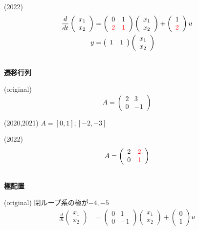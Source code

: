 \documentclass[a4paper,11pt,fleqn]{jreport}
\begin{document}
(2022)
\begin{align*}
	\frac{d}{dt}
	\left (
	\begin{array}{c}
	 x_1 \\ x_2 
	\end{array}
	\right )
	& = 
	\left (
	\begin{array}{cc}
	 0 & 1 \\
	 \color{red} 2 & \color{red} 1
	\end{array}
	\right )
	\left (
	\begin{array}{c}
	 x_1 \\ x_2 
	\end{array}
	\right )
	+
	\left (
	\begin{array}{c}
	 1 \\ \color{red} 2
	\end{array}
	\right )
	u
\\
	y 
	&=
	\left (
	\begin{array}{cc}
	 1 & 1  
	\end{array}
	\right )
	\left (
	\begin{array}{c}
	 x_1 \\ x_2 
	\end{array}
	\right )
\end{align*}

\ \\ \noindent
{\bf 遷移行列}

(original)
\[
	A= \left(\begin{array}{cc}
		2 & 3 \\
		0 & -1
	   \end{array} \right )
\]

(2020,2021) $A=[0,1];[-2,-3]$

(2022)
\[
	A= \left(\begin{array}{cc}
		2 & \color{red} 2 \\
		0 & \color{red} 1
	   \end{array} \right )
\]

\newpage
\ \\ \noindent
{\bf 極配置}

(original)
閉ループ系の極が$-4,-5$
\begin{align*}
	\frac{d}{dt}
	\left (
	\begin{array}{c}
	 x_1 \\ x_2 
	\end{array}
	\right )
	& = 
	\left (
	\begin{array}{cc}
	 0 & 1 \\
	 0 & -1
	\end{array}
	\right )
	\left (
	\begin{array}{c}
	 x_1 \\ x_2 
	\end{array}
	\right )
	+
	\left (
	\begin{array}{c}
	 0 \\ 1 
	\end{array}
	\right )
	u
\end{align*}
\end{document}
